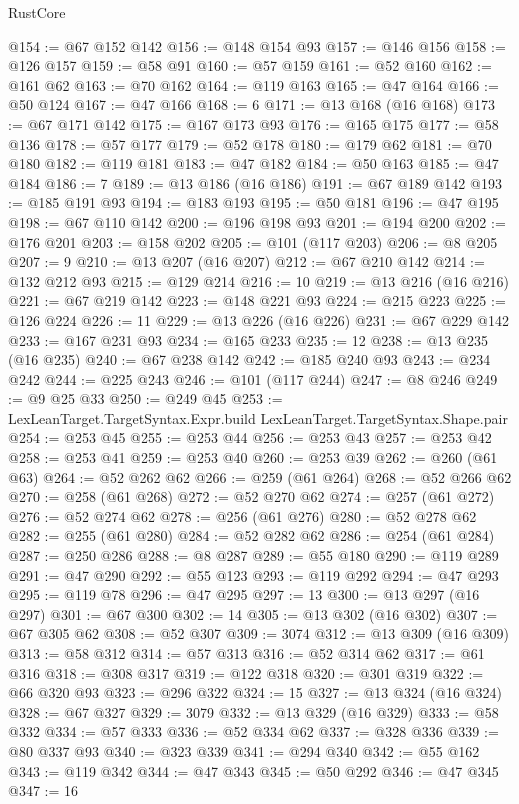 \begin{lexlean}{RustCore}
\begin{coremodule}
@154 := @67 @152 @142
@156 := @148 @154 @93
@157 := @146 @156
@158 := @126 @157
@159 := @58 @91
@160 := @57 @159
@161 := @52 @160
@162 := @161 @62
@163 := @70 @162
@164 := @119 @163
@165 := @47 @164
@166 := @50 @124
@167 := @47 @166
@168 := 6
@171 := @13 @168 (@16 @168)
@173 := @67 @171 @142
@175 := @167 @173 @93
@176 := @165 @175
@177 := @58 @136
@178 := @57 @177
@179 := @52 @178
@180 := @179 @62
@181 := @70 @180
@182 := @119 @181
@183 := @47 @182
@184 := @50 @163
@185 := @47 @184
@186 := 7
@189 := @13 @186 (@16 @186)
@191 := @67 @189 @142
@193 := @185 @191 @93
@194 := @183 @193
@195 := @50 @181
@196 := @47 @195
@198 := @67 @110 @142
@200 := @196 @198 @93
@201 := @194 @200
@202 := @176 @201
@203 := @158 @202
@205 := @101 (@117 @203)
@206 := @8 @205
@207 := 9
@210 := @13 @207 (@16 @207)
@212 := @67 @210 @142
@214 := @132 @212 @93
@215 := @129 @214
@216 := 10
@219 := @13 @216 (@16 @216)
@221 := @67 @219 @142
@223 := @148 @221 @93
@224 := @215 @223
@225 := @126 @224
@226 := 11
@229 := @13 @226 (@16 @226)
@231 := @67 @229 @142
@233 := @167 @231 @93
@234 := @165 @233
@235 := 12
@238 := @13 @235 (@16 @235)
@240 := @67 @238 @142
@242 := @185 @240 @93
@243 := @234 @242
@244 := @225 @243
@246 := @101 (@117 @244)
@247 := @8 @246
@249 := @9 @25 @33
@250 := @249 @45
@253 := LexLeanTarget.TargetSyntax.Expr.build LexLeanTarget.TargetSyntax.Shape.pair
@254 := @253 @45
@255 := @253 @44
@256 := @253 @43
@257 := @253 @42
@258 := @253 @41
@259 := @253 @40
@260 := @253 @39
@262 := @260 (@61 @63)
@264 := @52 @262 @62
@266 := @259 (@61 @264)
@268 := @52 @266 @62
@270 := @258 (@61 @268)
@272 := @52 @270 @62
@274 := @257 (@61 @272)
@276 := @52 @274 @62
@278 := @256 (@61 @276)
@280 := @52 @278 @62
@282 := @255 (@61 @280)
@284 := @52 @282 @62
@286 := @254 (@61 @284)
@287 := @250 @286
@288 := @8 @287
@289 := @55 @180
@290 := @119 @289
@291 := @47 @290
@292 := @55 @123
@293 := @119 @292
@294 := @47 @293
@295 := @119 @78
@296 := @47 @295
@297 := 13
@300 := @13 @297 (@16 @297)
@301 := @67 @300
@302 := 14
@305 := @13 @302 (@16 @302)
@307 := @67 @305 @62
@308 := @52 @307
@309 := 3074
@312 := @13 @309 (@16 @309)
@313 := @58 @312
@314 := @57 @313
@316 := @52 @314 @62
@317 := @61 @316
@318 := @308 @317
@319 := @122 @318
@320 := @301 @319
@322 := @66 @320 @93
@323 := @296 @322
@324 := 15
@327 := @13 @324 (@16 @324)
@328 := @67 @327
@329 := 3079
@332 := @13 @329 (@16 @329)
@333 := @58 @332
@334 := @57 @333
@336 := @52 @334 @62
@337 := @328 @336
@339 := @80 @337 @93
@340 := @323 @339
@341 := @294 @340
@342 := @55 @162
@343 := @119 @342
@344 := @47 @343
@345 := @50 @292
@346 := @47 @345
@347 := 16

\end{coremodule}
\end{lexlean}
